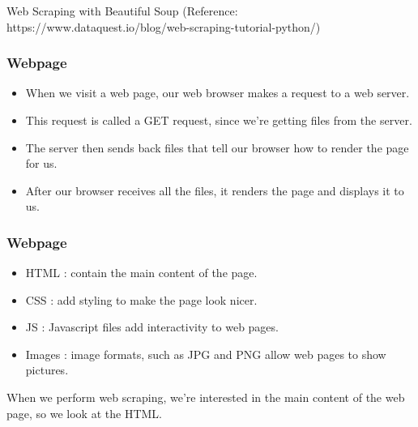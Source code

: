 \begin{frame}[fragile]\frametitle{}
\begin{center}
{\Large Web Scraping with Beautiful Soup}
\tiny{(Reference: https://www.dataquest.io/blog/web-scraping-tutorial-python/)}

\end{center}
\end{frame}


\begin{frame}[fragile]\frametitle{Webpage}

    \begin{itemize}
    \item  When we visit a web page, our web browser makes a request to a web server. 
    \item This request is called a GET request, since we're getting files from the server. 
    \item The server then sends back files that tell our browser how to render the page for us.
    \item After our browser receives all the files, it renders the page and displays it to us.
    \end{itemize}
\end{frame}

\begin{frame}[fragile]\frametitle{Webpage}

    \begin{itemize}
    \item  HTML : contain the main content of the page.
    \item CSS : add styling to make the page look nicer.
    \item JS : Javascript files add interactivity to web pages.
    \item Images : image formats, such as JPG and PNG allow web pages to show pictures.
    \end{itemize}
    When we perform web scraping, we're interested in the main content of the web page, so we look at the HTML.
\end{frame}

